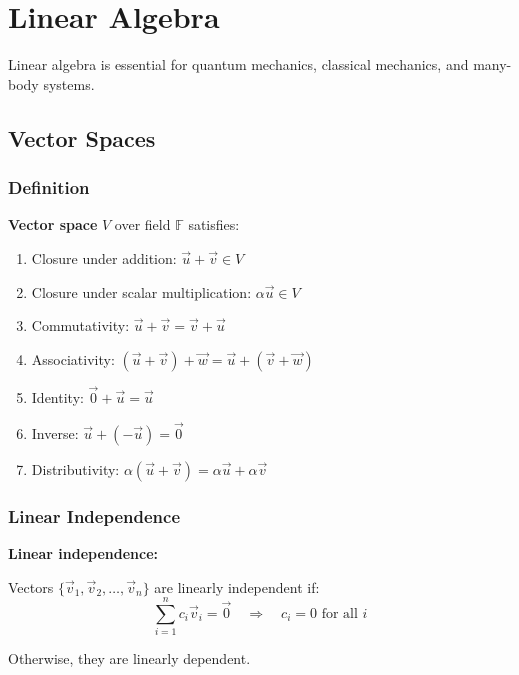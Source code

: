 \documentclass[12pt,a4paper]{article}
\begin{document}
\newpage

\section{Linear Algebra}
Linear algebra is essential for quantum mechanics, classical mechanics, and many-body systems.

\subsection{Vector Spaces}
\subsubsection{Definition}
\begin{formulabox}
\textbf{Vector space} $V$ over field $\mathbb{F}$ satisfies:
\begin{enumerate}
    \item Closure under addition: $\vec{u} + \vec{v} \in V$
    \item Closure under scalar multiplication: $\alpha\vec{u} \in V$
    \item Commutativity: $\vec{u} + \vec{v} = \vec{v} + \vec{u}$
    \item Associativity: $(\vec{u} + \vec{v}) + \vec{w} = \vec{u} + (\vec{v} + \vec{w})$
    \item Identity: $\vec{0} + \vec{u} = \vec{u}$
    \item Inverse: $\vec{u} + (-\vec{u}) = \vec{0}$
    \item Distributivity: $\alpha(\vec{u} + \vec{v}) = \alpha\vec{u} + \alpha\vec{v}$
\end{enumerate}
\end{formulabox}

\subsubsection{Linear Independence}
\begin{formulabox}
\textbf{Linear independence:}

Vectors $\{\vec{v}_1, \vec{v}_2, \ldots, \vec{v}_n\}$ are linearly independent if:
\begin{equation}
\sum_{i=1}^n c_i \vec{v}_i = \vec{0} \quad \Rightarrow \quad c_i = 0 \text{ for all } i
\end{equation}

Otherwise, they are linearly dependent.
\end{formulabox}
\end{document}
